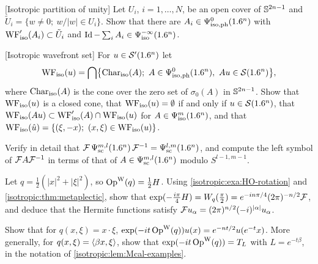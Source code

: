 \begin{exercise}\label{isotropic:ex:partition}
[Isotropic partition of unity] Let $U_i$, $i=1,\dots,N$, be an open cover of
$\mathbb{S}^{2n-1}$ and $\tilde U_i=\{w\ne0;\ w/|w|\in U_i\}$. Show that there are
$A_i\in\Psi^{0}_{\mathrm{iso,ph}}(1.6^n)$ with $\operatorname{WF}'_{\mathrm{iso}}(A_i)\subset\tilde U_i$ and
$\operatorname{Id}-\sum_iA_i\in\Psi^{-\infty}_{\mathrm{iso}}(1.6^n)$.
\end{exercise}

\begin{exercise}\label{isotropic:ex:WF-distribution}
[Isotropic wavefront set] For $u\in\mathcal{S}'(1.6^n)$ let
\begin{equation*}
  \WFiso(u)=\bigcap\bigl\{\Char_{\mathrm{iso}}(A);\ A\in\Psiisoph{0}(\R^n),\ Au\in\cS(\R^n)\bigr\},
\end{equation*}
where $\operatorname{Char}_{\mathrm{iso}}(A)$ is the cone over the zero set of $\sigma_0(A)$ in
$\mathbb{S}^{2n-1}$. Show that $\operatorname{WF}_{\mathrm{iso}}(u)$ is a closed cone, that
$\operatorname{WF}_{\mathrm{iso}}(u)=\emptyset$ if and only if $u\in\mathcal{S}(1.6^n)$, that
$\operatorname{WF}_{\mathrm{iso}}(Au)\subset\operatorname{WF}'_{\mathrm{iso}}(A)\cap\operatorname{WF}_{\mathrm{iso}}(u)$ for $A\in\Psi^{m}_{\mathrm{iso}}(1.6^n)$,
and that $\WFiso(\hat u)=\{(\xi,-x);\ (x,\xi)\in\WFiso(u)\}$.
\end{exercise}

\begin{exercise}\label{isotropic:ex:sc-fourier}
Verify in detail that $\mathcal{F}\,\Psi^{m,l}_{\mathrm{sc}}(1.6^n)\,\mathcal{F}^{-1}=\Psi^{l,m}_{\mathrm{sc}}(1.6^n)$, and
compute the left symbol of $\mathcal{F} A\mathcal{F}^{-1}$ in terms of that of $A\in\Psi^{m,l}_{\mathrm{sc}}(1.6^n)$
modulo $S^{l-1,m-1}$.
\end{exercise}

\begin{exercise}\label{isotropic:ex:fourier-mp}
Let $q=\frac12(|x|^2+|\xi|^2)$, so $\operatorname{Op}^{\mathrm{W}}(q)=\frac12H$. Using
\cref{isotropic:exa:HO-rotation} and \cref{isotropic:thm:metaplectic}, show that
$\exp(-\frac{i\pi}{4}H)=W_q(\frac\pi2)=e^{-in\pi/4}(2\pi)^{-n/2}\mathcal{F}$, and deduce
that the Hermite functions satisfy $\mathcal{F} u_\alpha=(2\pi)^{n/2}(-i)^{|\alpha|}u_\alpha$.
\end{exercise}

\begin{exercise}\label{isotropic:ex:dilation}
Show that for $q(x,\xi)=x\cdot\xi$, $\exp(-it\operatorname{Op}^{\mathrm{W}}(q))u(x)=e^{-nt/2}u(e^{-t}x)$.
More generally, for $q(x,\xi)=\langle \beta x, \xi\rangle$, show that
$\exp(-it\operatorname{Op}^{\mathrm{W}}(q))=T_{L}$ with $L=e^{-t\beta}$, in the notation of
\cref{isotropic:lem:Mcal-examples}.
\end{exercise}


